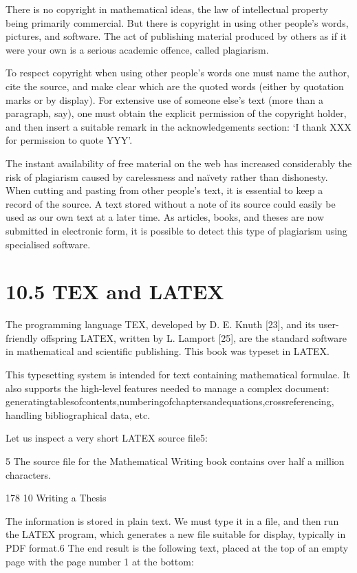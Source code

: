 \documentclass[11pt]{article}
\theoremstyle{plain}
\theoremstyle{definition}
\begin{document}
There is no copyright in mathematical ideas, the law of intellectual property being primarily commercial. But there is copyright in using other people's words, pictures, and software. The act of publishing material produced by others as if it were your own is a serious academic offence, called plagiarism.

To respect copyright when using other people's words one must name the author, cite the source, and make clear which are the quoted words (either by quotation marks or by display). For extensive use of someone else's text (more than a paragraph, say), one must obtain the explicit permission of the copyright holder, and then insert a suitable remark in the acknowledgements section: `I thank XXX for permission to quote YYY'.

The instant availability of free material on the web has increased considerably the risk of plagiarism caused by carelessness and naïvety rather than dishonesty. When cutting and pasting from other people's text, it is essential to keep a record of the source. A text stored without a note of its source could easily be used as our own text at a later time. As articles, books, and theses are now submitted in electronic form, it is possible to detect this type of plagiarism using specialised software.

\section{10.5 TEX and LATEX}

The programming language TEX, developed by D. E. Knuth [23], and its user-friendly offspring LATEX, written by L. Lamport [25], are the standard software in mathematical and scientific publishing. This book was typeset in LATEX.

This typesetting system is intended for text containing mathematical formulae. It also supports the high-level features needed to manage a complex document: generatingtablesofcontents,numberingofchaptersandequations,crossreferencing, handling bibliographical data, etc.

Let us inspect a very short LATEX source file5:

5 The source file for the Mathematical Writing book contains over half a million characters.

178 10 Writing a Thesis

The information is stored in plain text. We must type it in a file, and then run the LATEX program, which generates a new file suitable for display, typically in PDF format.6 The end result is the following text, placed at the top of an empty page with the page number 1 at the bottom:
\end{document}
